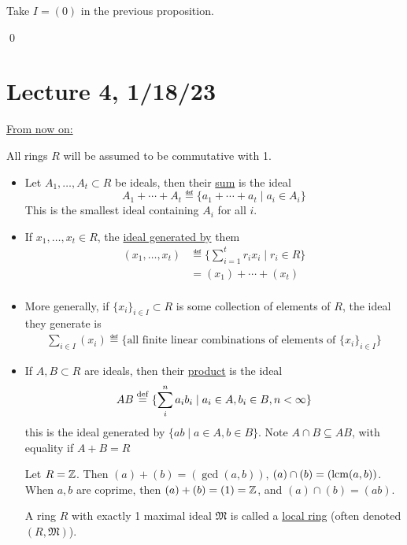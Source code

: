 \documentclass[x11names,reqno,14pt]{extarticle}
\begin{document}
\proof

Take $I = (0)$ in the previous proposition. 

\qed

\section*{Lecture 4, 1/18/23}

\underline{From now on:}

All rings $R$ will be assumed to be commutative with 1.

\begin{itemize}
\item Let $A_1, \dots, A_t\subset R$ be ideals, then their \underline{sum} is the ideal 
\[
A_1 + \cdots + A_t \eqdef \{a_1 + \cdots + a_t \mid a_i \in A_i\}
\]
This is the smallest ideal containing $A_i$ for all $i$. 

\item If $x_1, \dots, x_t \in R$, the \underline{ideal generated by} them
\begin{align*}
(x_1,\dots, x_t)  & \eqdef \{\sum_{i=1}^tr_ix_i \mid r_i \in R\}\\
						 & = (x_1) + \cdots + (x_t) \\
\end{align*}

\item More generally, if $\{x_i\}_{i\in I}\subset R$ is some collection of elements of $R$, the ideal they generate is
\begin{align*}
\sum_{i\in I}(x_i)\eqdef \{\text{all finite linear combinations of elements of }\{x_i\}_{i\in I}\} 
\end{align*}

\item If $A, B \subset R$ are ideals, then their \underline{product} is the ideal
\[
AB \overset{\mathrm{def}}{=} \{\sum_i^n a_ib_i \mid a_i\in A, b_i \in B, n < \infty\}
\]
this is the ideal generated by $\{ab\mid a\in A, b \in B\}$. Note $A\cap B \subseteq AB$, with equality if $A + B = R$

\exm Let $R = \mathbb{Z}$. Then $(a) + (b) = (\gcd(a,b))$, $(a)\cap (b) = (\operatorname{\mathrm{lcm}}(a, b))$. When $a, b$ are coprime, then $(a) + (b) = (1) = \mathbb{Z}$, and $(a) \cap (b) = (ab)$.

 A ring $R$ with exactly 1 maximal ideal $\mathfrak{M}$ is called a \underline{local ring} (often denoted $(R, \mathfrak{M})$).

\end{itemize}
\end{document}
